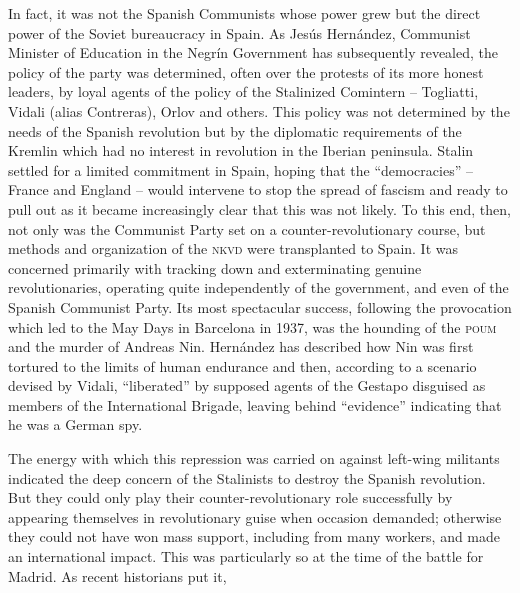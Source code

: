 \indexJHernandez
In fact, it was not the Spanish Communists whose power grew but the direct power of the Soviet bureaucracy in Spain. As Jes\'us Hern\'andez, Communist Minister of Education in the Negr\'in Government has subsequently revealed, the policy of the party was determined, often over the protests of its more honest leaders, by loyal agents of the policy of the Stalinized Comintern -- Togliatti, Vidali{\indexVVidali} (alias Contreras), Orlov and others. This policy was not determined by the needs of the Spanish revolution but by the diplomatic requirements of the Kremlin which had no interest in revolution in the Iberian peninsula. Stalin settled for a limited commitment in Spain, hoping that the ``democracies'' -- France and England -- would intervene to stop the spread of fascism and ready to pull out as it became increasingly clear that this was not likely. To this end, then, not only was the Communist Party set on a  counter-revolutionary course, but methods and organization of the \textsc{nkvd} were transplanted to Spain. It was concerned primarily with tracking down and exterminating genuine revolutionaries, operating quite independently of the government, and even of the Spanish Communist Party. Its most spectacular success, following the provocation which led to the May Days in Barcelona in 1937, was the hounding of the \indexPOUM\textsc{poum} and the murder of Andreas Nin.{\indexANin} Hern\'andez has described how Nin was first tortured to the limits of human endurance and then, according to a scenario devised by Vidali, ``liberated'' by supposed agents of the Gestapo disguised as members of the International Brigade, leaving behind ``evidence'' indicating that he was a German spy.

The energy with which this repression was carried on against left-wing militants indicated the deep concern of the Stalinists to \mbox{destroy} the Spanish revolution. But they could only play their counter-revolu\-tionary role successfully by appearing themselves in revolutionary guise when occasion demanded; otherwise they could not have won mass support, including from many workers, and made an international impact. This was particularly so at the time of the battle for Madrid. As recent historians put it,

